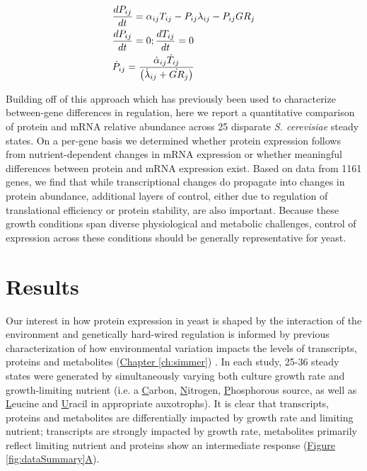 \begin{align}
&\frac{dP_{ij}}{dt} = \alpha_{ij}T_{ij} - P_{ij}\lambda_{ij} - P_{ij}GR_{j}\notag\\
&\frac{dP_{ij}}{dt} = 0 ; \frac{dT_{ij}}{dt} = 0 \notag\\
&\dot{P}_{ij} = \frac{\dot{\alpha}_{ij}\dot{T}_{ij}}{\left(\dot{\lambda}_{ij} + \dot{GR}_{j}\right)}\label{steady_expression}
\end{align}


Building off of this approach which has previously been used to characterize between-gene differences in regulation, here we report a quantitative comparison of protein and mRNA relative abundance across 25 disparate \textit{S. cerevisiae} steady states.  On a per-gene basis we determined whether protein expression follows from nutrient-dependent changes in mRNA expression or whether meaningful differences between protein and mRNA expression exist.  Based on data from 1161 genes, we find that while transcriptional changes do propagate into changes in protein abundance, additional layers of control, either due to regulation of translational efficiency or protein stability, are also important. Because these growth conditions span diverse physiological and metabolic challenges, control of expression across these conditions should be generally representative for yeast.

\section{Results}

Our interest in how protein expression in yeast is shaped by the interaction of the environment and genetically hard-wired regulation is informed by previous characterization of how environmental variation impacts the levels of transcripts, proteins and metabolites (\hyperref[ch:simmer]{Chapter \ref{ch:simmer}}) \cite{Brauer:2008jn, Boer:2010fb}. In each study, 25-36 steady states were generated by simultaneously varying both culture growth rate and growth-limiting nutrient (i.e. a \underline{C}arbon, \underline{N}itrogen, \underline{P}hosphorous source, as well as \underline{L}eucine and \underline{U}racil in appropriate auxotrophs). It is clear that transcripts, proteins and metabolites are differentially impacted by growth rate and limiting nutrient; transcripts are strongly impacted by growth rate, metabolites primarily reflect limiting nutrient and proteins show an intermediate response (\hyperref[fig:dataSummary]{Figure \ref{fig:dataSummary}A}).

